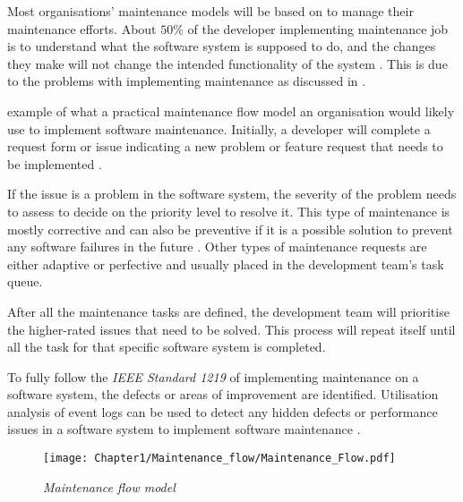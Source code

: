Most organisations' maintenance models will be based on  to manage their maintenance efforts. About $50\%$ of the developer implementing maintenance job is to understand what the software system is supposed to do, and the changes they make will not change the intended functionality of the system \cite{Tang2010,Zhuo1993}. This is due to the problems with implementing maintenance as discussed in .\par {} example of what a practical maintenance flow model an organisation would likely use to implement software maintenance. Initially, a developer will complete a request form or issue indicating a new problem or feature request that needs to be implemented \cite{Tang2010}.\par If the issue is a problem in the software system, the severity of the problem needs to assess to decide on the priority level to resolve it. This type of maintenance is mostly corrective and can also be preventive if it is a possible solution to prevent any software failures in the future \cite{Tang2010}. Other types of maintenance requests are either adaptive or perfective and usually placed in the development team's task queue.\par After all the maintenance tasks are defined, the development team will prioritise the higher-rated issues that need to be solved. This process will repeat itself until all the task for that specific software system is completed.\par To fully follow the \textit{IEEE Standard 1219} of implementing maintenance on a software system, the defects or areas of improvement are identified. Utilisation analysis of event logs can be used to detect any hidden defects or performance issues in a software system to implement software maintenance \cite{Cinque2013, Rong2018a, Levin2019}.

\begin{figure}[!htb] %
	\centering %
	\texttt{[image: Chapter1/Maintenance\_flow/Maintenance\_Flow.pdf]}
	\caption[Maintenance flow model]
	{\textit{Maintenance flow model \cite{Tang2010}}} \label{fig:CH1_MaintenanceFlow}
\end{figure}

\clearpage

